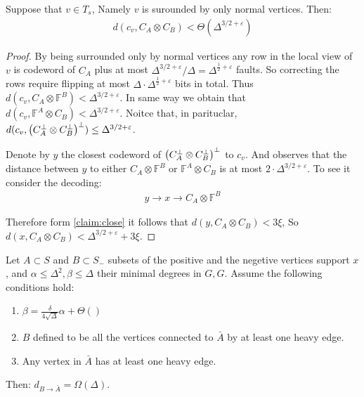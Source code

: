 \begin{claim}
  \label{claim:closeto}
  Suppose that $v \in T_{s}$, Namely $v$ is surounded by only normal vertices. Then:
  \begin{equation*}
    \begin{split}
      d\left( c_{v}, C_{A}\otimes C_{B}\right) < \Theta\left( \Delta^{3/2+\varepsilon} \right)
    \end{split}
  \end{equation*} 
 \end{claim}
\begin{proof}
  By being surrounded only by normal vertices any row in the local view of $v$ is codeword of $C_{A}$ plus at most $\Delta^{3/2 + \varepsilon}/\Delta = \Delta^{\frac{1}{2}+\varepsilon}$ faults. So correcting the rows require flipping at most $\Delta \cdot \Delta^{\frac{1}{2} + \varepsilon}$ bits in total.  Thus $d\left(c_{v}, C_{A}\otimes \mathbb{F}^{B}\right) < \Delta^{3/2 + \varepsilon}$. In same way we obtain that $d\left(c_{v},  \mathbb{F}^{A} \otimes C_{B}\right) < \Delta^{3/2 + \varepsilon}$. Noitce that, in parituclar, $d(c_{v}, \left( C_{A}^{\perp}\otimes C_{B}^{\perp} \right)^{\perp}) \le \Delta^{3/2 + \varepsilon}$.

  Denote by $y$ the closest codeword of $\left( C_{A}^{\perp}\otimes C_{B}^{\perp} \right)^{\perp}$ to $c_{v}$. And observes that the distance between $y$ to either $C_{A} \otimes \mathbb{F}^{B}$ or $\mathbb{F}^{A}\otimes C_{B}$ is at most $2 \cdot \Delta^{3/2 + \varepsilon}$. To see it consider the decoding: 
  \begin{equation*}
    \begin{split}
  y \rightarrow x \rightarrow C_{A} \otimes \mathbb{F}^{B}   
    \end{split}
  \end{equation*}
  
  Therefore form \cref{claim:close} it follows that $d\left(y, C_{A} \otimes C_{B}\right) < 3 \xi $, So $d\left(x, C_{A} \otimes C_{B}\right) < \Delta^{3/2 + \varepsilon} +  3 \xi $.
     \end{proof}
   
   
 
 \begin{claim}  
   \label{cliam:tech} Let $A \subset S$ and $B \subset S_{-}$ subsets of the positive and the negetive vertices support $x$, and $\alpha \le \Delta^{2},\beta \le \Delta$ their minimal degrees in $G, G$. Assume the following conditions hold:
   \begin{enumerate}
     \item $\beta = \frac{\delta}{4 \sqrt{\Delta}}\alpha + \Theta\left(  \right)$
     \item $B$ defined to be all the vertices connected to $\bar{A}$ by at least one heavy edge.
     \item Any vertex in $\bar{A}$ has at least one heavy edge. 
   \end{enumerate}
   Then: $d_{B\rightarrow \bar{A}} = \Omega\left( \Delta \right)$.  
 \end{claim}

